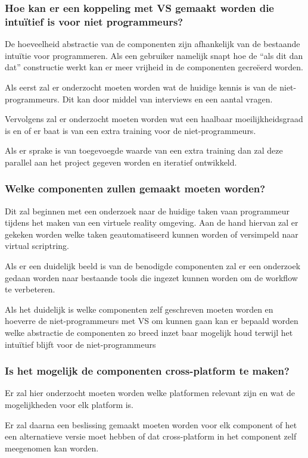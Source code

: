 \subsubsection{Hoe kan er een koppeling met VS gemaakt worden die intuïtief is voor niet programmeurs?}

De hoeveelheid abstractie van de componenten zijn afhankelijk van de bestaande intuïtie voor programmeren. Als een gebruiker namelijk snapt hoe de “als dit dan dat” constructie werkt kan er meer vrijheid in de componenten gecreëerd worden.

Als eerst zal er onderzocht moeten worden wat de huidige kennis is van de niet-programmeurs. Dit kan door middel van interviews en een aantal vragen.

Vervolgens zal er onderzocht moeten worden wat een haalbaar moeilijkheidsgraad is en of er baat is van een extra training voor de niet-programmeurs.

Als er sprake is van toegevoegde waarde van een extra training dan zal deze parallel aan het project gegeven worden en iteratief ontwikkeld.

\subsubsection{Welke componenten zullen gemaakt moeten worden?}
Dit zal beginnen met een onderzoek naar de huidige taken vaan programmeur tijdens het maken van een virtuele reality omgeving. Aan de hand hiervan zal er gekeken worden welke taken geautomatiseerd kunnen worden of versimpeld naar virtual scriptring.

Als er een duidelijk beeld is van de benodigde componenten zal er een onderzoek gedaan worden naar bestaande tools die ingezet kunnen worden om de workflow te verbeteren.

Als het duidelijk is welke componenten zelf geschreven moeten worden en hoeverre de niet-programmeurs met VS om kunnen gaan kan er bepaald worden welke abstractie de componenten zo breed inzet baar mogelijk houd terwijl het intuïtief blijft voor de niet-programmeurs

\subsubsection{Is het mogelijk de componenten cross-platform te maken?}
Er zal hier onderzocht moeten worden welke platformen relevant zijn en wat de mogelijkheden voor elk platform is.

Er zal daarna een beslissing gemaakt moeten worden voor elk component of het een alternatieve versie moet hebben of dat cross-platform in het component zelf meegenomen kan worden.
